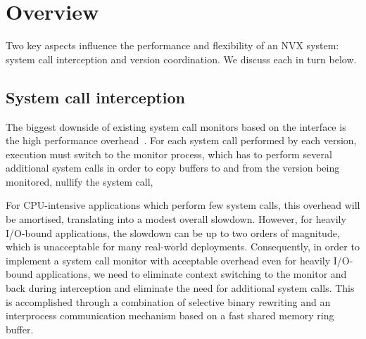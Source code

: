 \section{Overview}
\label{sec:overview}

Two key aspects influence the performance and flexibility of an NVX
system: system call interception and version coordination.  We discuss
each in turn below.

\subsection{System call interception}
\label{sec:interception}


The biggest downside of existing system call monitors based on the
\ptrace interface is the high performance
overhead~\cite{orchestra09,tachyon12}.  For each system call
performed by each version, execution must switch to the monitor
process, which has to perform several additional system calls in order
to copy buffers to and from the version being monitored, nullify the
system call, \etc

For CPU-intensive applications which perform few system calls, this
overhead will be amortised, translating into a modest overall
slowdown.  However, for heavily I/O-bound applications, the slowdown
can be up to two orders of magnitude, which is unacceptable for many
real-world deployments.
%
Consequently, in order to implement a system call monitor with
acceptable overhead even for heavily I/O-bound applications, we need
to eliminate context switching to the monitor and back during
interception and eliminate the need for additional system calls.  
This is accomplished through a combination of selective binary
rewriting and an interprocess communication mechanism based on a
fast shared memory ring buffer.

